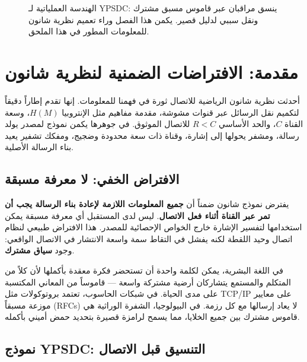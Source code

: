 \documentclass[12pt,a4paper]{article}
\newcommand{\Keff}{K_{\mathrm{eff}}}
\theoremstyle{remark}
\begin{document}
\begin{otherlanguage}{english}
\begin{figure}[htbp]
			\caption{الهندسة العملياتية لـ YPSDC: ينسق مراقبان عبر قاموس مسبق مشترك ونقل سببي لدليل قصير. يكمن هذا الفصل وراء تعميم نظرية شانون للمعلومات المطور في هذا الملحق.}
			\label{fig:ypsdc-scheme}
		\end{figure}
	\end{otherlanguage}
	
	\section{مقدمة: الافتراضات الضمنية لنظرية شانون}
	\label{sec:intro}
	
	أحدثت نظرية شانون الرياضية للاتصال \cite{Shannon1948} ثورة في فهمنا للمعلومات. إنها تقدم إطاراً دقيقاً لتكميم نقل الرسائل عبر قنوات مشوشة، مقدمة مفاهيم مثل الإنتروبيا $H(M)$، وسعة القناة $C$، والحد الأساسي $R < C$ للاتصال الموثوق. في جوهرها يكمن نموذج لمصدر يولد رسالة، ومشفر يحولها إلى إشارة، وقناة ذات سعة محدودة وضجيج، ومفكك تشفير يعيد بناء الرسالة الأصلية.
	
	\subsection{الافتراض الخفي: لا معرفة مسبقة}
	
	يفترض نموذج شانون ضمناً أن \textbf{جميع المعلومات اللازمة لإعادة بناء الرسالة يجب أن تمر عبر القناة أثناء فعل الاتصال}. ليس لدى المستقبل أي معرفة مسبقة يمكن استخدامها لتفسير الإشارة خارج الخواص الإحصائية للمصدر. هذا الافتراض طبيعي لنظام اتصال وحيد اللقطة لكنه يفشل في التقاط سمة واسعة الانتشار في الاتصال الواقعي: وجود \textbf{سياق مشترك}.
	
	في اللغة البشرية، يمكن لكلمة واحدة أن تستحضر فكرة معقدة بأكملها لأن كلاً من المتكلم والمستمع يتشاركان أرضية مشتركة واسعة — قاموساً من المعاني المكتسبة على مدى الحياة. في شبكات الحاسوب، تعتمد بروتوكولات مثل TCP/IP على معايير موزعة مسبقاً (RFCs) لا يعاد إرسالها مع كل رزمة. في البيولوجيا، الشفرة الوراثية هي قاموس مشترك بين جميع الخلايا، مما يسمح لرامزة قصيرة بتحديد حمض أميني بأكمله.
	
	\subsection{نموذج YPSDC: التنسيق قبل الاتصال}
	
\end{document}
